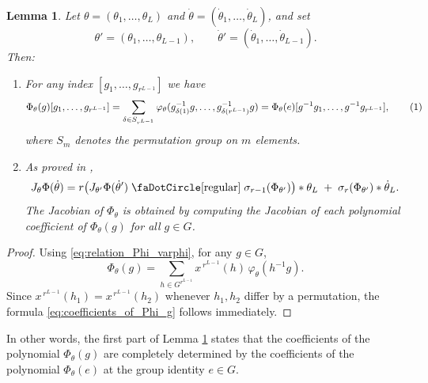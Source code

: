 \documentclass[final]{article}
\newcommand\numberthis{\addtocounter{equation}{1}\tag{\theequation}}
\newcommand{\conv}{\ast}
\newcommand{\circbd}{\mathrel{\text{\faDotCircle[regular]}}}
\theoremstyle{definition}
\theoremstyle{plain}
\newtheorem{lemma}[definition]{Lemma}
\begin{document}
\begin{lemma}\label{lemma :Jacobian_of_Phi_and_relation_between_varphi_Phi}
Let \(\theta=(\theta_1,\dots,\theta_L)\) and \(\dot\theta=(\dot\theta_1,\dots,\dot\theta_L)\), and set 
\[
\theta'=(\theta_1,\dots,\theta_{L-1}),\qquad
\dot\theta'=(\dot\theta_1,\dots,\dot\theta_{L-1}).
\]
Then:
\begin{enumerate}
    \item For any index \([g_1,\dots,g_{r^{L-1}}]\) we have
    \[
    \Phi_\theta(g)[g_1,\dots,g_{r^{L-1}}]
      = \sum_{\delta\in S_{r^{L-1}}}
        \varphi_\theta(
            g_{\delta(1)}^{-1}g,
            \dots,
            g_{\delta(r^{L-1})}^{-1}g
        )
      = \Phi_\theta(e)[g^{-1}g_1,\dots,g^{-1}g_{r^{L-1}}],
    \numberthis\label{eq:coefficients_of_Phi_g}
    \]
    where \(S_m\) denotes the permutation group on \(m\) elements.

    \item As proved in \cite{shahverdi2024geometryoptimizationpolynomialconvolutional},
    \[
    J_\theta\Phi(\dot\theta)
      =
      r\bigl(
         J_{\theta'}\Phi(\dot\theta')
         \circbd
         \sigma_{r-1}(\Phi_{\theta'})
       \bigr) \conv \theta_L
      \;+\;
      \sigma_r(\Phi_{\theta'})\conv \dot\theta_L .
    \]
    The Jacobian of \(\Phi_\theta\) is obtained by computing the Jacobian of each polynomial coefficient of \(\Phi_\theta(g)\) for all \(g\in G\).
\end{enumerate}
\end{lemma}

\begin{proof}
Using \eqref{eq:relation_Phi_varphi}, for any \(g\in G\),
\[
\Phi_\theta(g)
  = \sum_{h\in G^{r^{L-1}}} x^{\,r^{L-1}}(h)\,
    \varphi_\theta(h^{-1}g).
\]
Since \(x^{\,r^{L-1}}(h_1)=x^{\,r^{L-1}}(h_2)\) whenever \(h_1,h_2\) differ by a permutation, the formula \eqref{eq:coefficients_of_Phi_g} follows immediately.
\end{proof}

In other words, the first part of Lemma \ref{lemma :Jacobian_of_Phi_and_relation_between_varphi_Phi} states that the coefficients of the polynomial $\Phi_\theta(g)$ are completely determined by the coefficients of the polynomial $\Phi_\theta(e)$ at the group identity $e\in G$.
\end{document}
